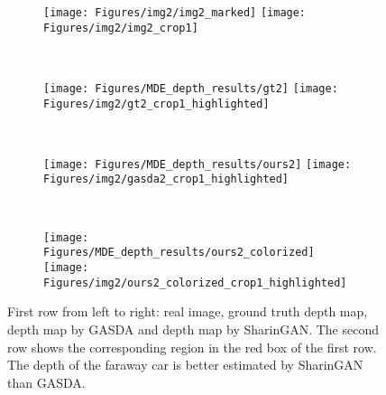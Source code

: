 \documentclass[10pt,twocolumn,letterpaper]{article}
\begin{document}
\begin{figure*}
\begin{subfigure}[t]{\linewidth}
    \begin{subfigure}[t]{0.25\linewidth}
        \texttt{[image: Figures/img2/img2\_marked]}
        \texttt{[image: Figures/img2/img2\_crop1]}
    \end{subfigure}~
    \begin{subfigure}[t]{0.25\linewidth}
        \texttt{[image: Figures/MDE\_depth\_results/gt2]}
        \texttt{[image: Figures/img2/gt2\_crop1\_highlighted]}
    \end{subfigure}~
    \begin{subfigure}[t]{0.25\linewidth}
        \texttt{[image: Figures/MDE\_depth\_results/ours2]}
        \texttt{[image: Figures/img2/gasda2\_crop1\_highlighted]}
    \end{subfigure}~
    \begin{subfigure}[t]{0.25\linewidth}
        \texttt{[image: Figures/MDE\_depth\_results/ours2\_colorized]}
        \texttt{[image: Figures/img2/ours2\_colorized\_crop1\_highlighted]}
    \end{subfigure}\caption{First row from left to right: real image, ground truth depth map, depth map by GASDA \cite{GASDA} and depth map by SharinGAN. The second row shows the corresponding region in the red box of the first row. The depth of the faraway car is better estimated by SharinGAN than GASDA.}
    \vspace*{4mm}
\end{subfigure}


\end{figure*}
\end{document}
